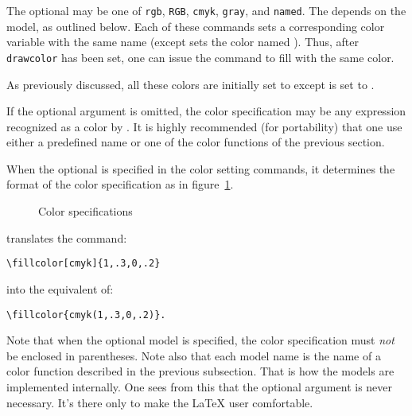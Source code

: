 \documentclass[letterpaper]{article}
\begin{document}
The optional  may be one of \texttt{rgb}, \texttt{RGB},
\texttt{cmyk}, \texttt{gray}, and \texttt{named}. The 
depends on the model, as outlined below. Each of these commands sets a
corresponding \MP{} color variable with the same name (except
 sets the color named ). Thus, after
\texttt{drawcolor} has been set, one can issue the command
 to fill with the same color.

As previously discussed, all these colors are initially set to
 except  is set to .

If the optional  argument is omitted, the color
specification may be any expression recognized as a color by \MP{}. It
is highly recommended (for portability) that one use either a predefined
name or one of the color functions of the previous section.

When the optional  is specified in the color setting
commands, it determines the format of the color specification as in
figure~\ref{fig:colorspecs}.

\begin{figure}[hbt]
\caption{Color specifications}
\label{fig:colorspecs}
\end{figure}

\pagebreak[3]
\Mfp{} translates the command:
\begin{verbatim}
\fillcolor[cmyk]{1,.3,0,.2}
\end{verbatim}
into the equivalent of:
\begin{verbatim}
\fillcolor{cmyk(1,.3,0,.2)}.
\end{verbatim}
Note that when the optional model is specified, the color specification
must \emph{not} be enclosed in parentheses. Note also that each model
name is the name of a color function described in the previous
subsection. That is how the models are implemented internally. One sees
from this that the optional argument is never necessary. It's there only
to make the \LaTeX{} user comfortable.
\end{document}
